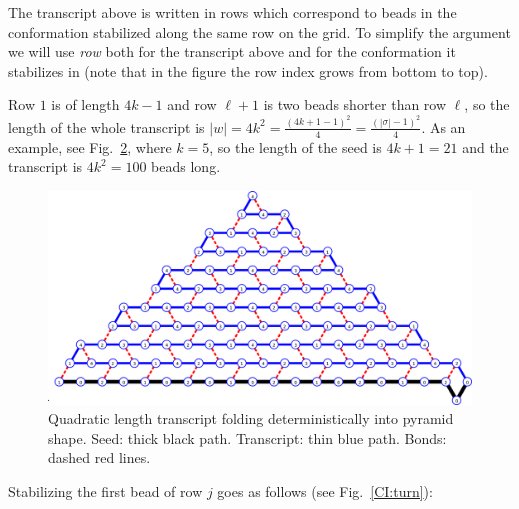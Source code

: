 \begin{figure}[h]
\begin{minipage}{.49\textwidth}
	\end{minipage}
	\caption{}
	\label{table:transcript}
\end{figure}

The transcript above is written in rows which correspond to beads in the conformation stabilized along the same row on the grid. To simplify the argument we will use \textit{row} both for the transcript above and for the conformation it stabilizes in (note that in the figure the row index grows from bottom to top). 

Row $1$ is of length $4k-1$ and row $\ell+1$ is two beads shorter than row $\ell$, so the length of the whole transcript is $|w|=4k^2=\frac{(4k+1-1)^2}{4}=\frac{(|\sigma|-1)^2}{4}$. As an example, see Fig.~\ref{CI:big}, where $k=5$, so the length of the seed is $4k+1=21$ and the transcript is $4k^2 = 100$ beads long.

\begin{figure}
	\centering
	\includegraphics[width=0.9\linewidth]{./Fig/CI_Numbers}
	\caption{Quadratic length transcript folding deterministically into pyramid shape. Seed: thick black path. Transcript: thin blue path. Bonds: dashed red lines. }
	\label{CI:big}
\end{figure}


Stabilizing the first bead of row $j$ goes as follows (see Fig.~\ref{CI:turn}):

